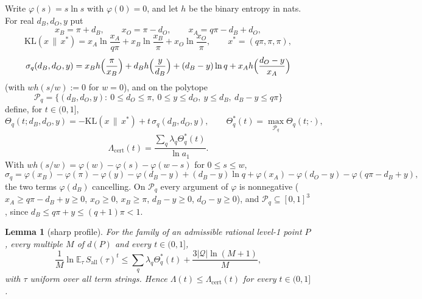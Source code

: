 \documentclass[11pt]{article}
\newtheorem{lemma}[theorem]{Lemma}
\theoremstyle{definition}
\theoremstyle{remark}
\newcommand{\abs}[1]{\lvert #1\rvert}
\newcommand{\Hb}{h}                           %
\newcommand{\Lam}{\Lambda}                    %
\newcommand{\Lamcert}{\Lambda_{\mathrm{cert}}}%
\newcommand{\Qs}{\mathcal{Q}}                 %
\newcommand{\Sall}{S_{\mathrm{all}}}          %
\newcommand{\KL}{\mathrm{KL}}                        %
\newcommand{\Polq}{\mathcal P}                       %
\begin{document}
Write $\varphi(s)=s\ln s$ with $\varphi(0)=0$, and let $\Hb$ be the binary entropy in nats. For real $d_B,d_O,y$ put
\[
x_B=\pi+d_B,\qquad x_O=\pi-d_O,\qquad x_A=q\pi-d_B+d_O,
\]
\[
\KL(x\,\|\,x^*)=x_A\ln\frac{x_A}{q\pi}+x_B\ln\frac{x_B}{\pi}+x_O\ln\frac{x_O}{\pi},\qquad x^*=(q\pi,\pi,\pi),
\]
\[
\sigma_q(d_B,d_O,y)=x_B\Hb\Bigl(\frac\pi{x_B}\Bigr)+d_B\Hb\Bigl(\frac y{d_B}\Bigr)+(d_B-y)\ln q+x_A\Hb\Bigl(\frac{d_O-y}{x_A}\Bigr)
\]
(with $w\Hb(s/w):=0$ for $w=0$), and on the polytope
\[
\Polq_q=\bigl\{(d_B,d_O,y):\ 0\le d_O\le\pi,\ 0\le y\le d_O,\ y\le d_B,\ d_B-y\le q\pi\bigr\}
\]
define, for $t\in(0,1]$,
\[
\Theta_q(t;d_B,d_O,y)=-\KL(x\,\|\,x^*)+t\,\sigma_q(d_B,d_O,y),\qquad\Theta^*_q(t)=\max_{\Polq_q}\Theta_q(t;\cdot),
\]
\[
\Lamcert(t)=\frac{\sum_q\lambda_q\Theta^*_q(t)}{\ln a_1}.
\]
With $w\Hb(s/w)=\varphi(w)-\varphi(s)-\varphi(w-s)$ for $0\le s\le w$,
\[
\sigma_q=\varphi(x_B)-\varphi(\pi)-\varphi(y)-\varphi(d_B-y)+(d_B-y)\ln q+\varphi(x_A)-\varphi(d_O-y)-\varphi(q\pi-d_B+y),
\]
the two terms $\varphi(d_B)$ cancelling. On $\Polq_q$ every argument of $\varphi$ is nonnegative ($x_A\ge q\pi-d_B+y\ge0$, $x_O\ge0$, $x_B\ge\pi$, $d_B-y\ge0$, $d_O-y\ge0$), and $\Polq_q\subseteq[0,1]^3$, since $d_B\le q\pi+y\le(q+1)\pi<1$.

\begin{lemma}[sharp profile]\label{cp:G1}
For the family of an admissible rational level-1 point $P$, every multiple $M$ of $d(P)$ and every $t\in(0,1]$,
\[
\frac1M\ln\mathbb E_\tau\,\Sall(\tau)^t\le\sum_q\lambda_q\Theta^*_q(t)+\frac{3\abs\Qs\ln(M+1)}M,
\]
with $\tau$ uniform over all term strings. Hence $\Lam(t)\le\Lamcert(t)$ for every $t\in(0,1]$.
\end{lemma}
\end{document}
